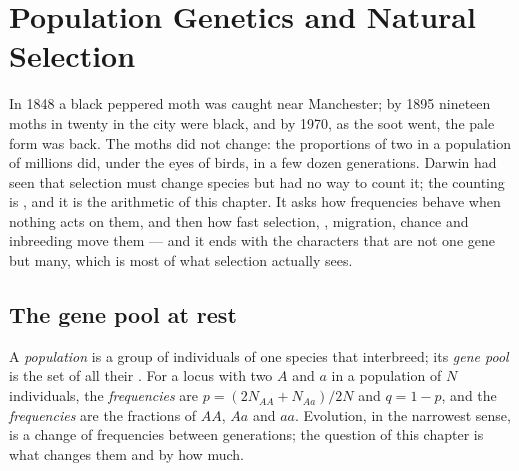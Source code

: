 \chapter{Population Genetics and Natural Selection}\label{ch:b2:population-genetics}

In 1848 a black peppered moth was caught near Manchester; by 1895
nineteen moths in twenty in the city were black, and by 1970, as the
soot went, the pale form was back. The moths did not change: the
proportions of two  in a population of millions did, under
the eyes of birds, in a few dozen generations. Darwin had seen that
selection must change species but had no way to count it; the
counting is , and it is the arithmetic of this
chapter. It asks how  frequencies behave when nothing acts on
them, and then how fast selection, , migration, chance and
inbreeding move them --- and it ends with the characters that are
not one gene but many, which is most of what selection actually
sees.

\section{The gene pool at rest}

\begin{definition}\label{def:b2:population-genetics:frequencies}
A \emph{population} is a group of individuals of one species that
interbreed; its \emph{gene pool} is the set of all their .
For a locus with two  $A$ and $a$ in a  population of
$N$ individuals, the \emph{ frequencies} are $p = (2N_{AA} +
N_{Aa})/2N$ and $q = 1 - p$, and the \emph{ frequencies} are
the fractions of $AA$, $Aa$ and $aa$. Evolution, in the narrowest
sense, is a change of  frequencies between generations; the
question of this chapter is what changes them and by how much.
\end{definition}

